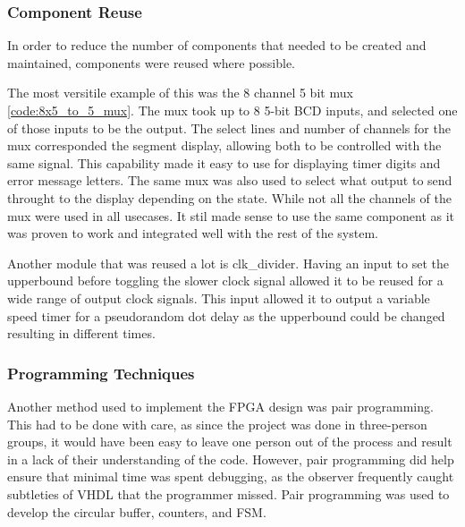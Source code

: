 \documentclass[11pt]{article}
\begin{document}


\subsubsection{Component Reuse}

In order to reduce the number of components that needed to be created and maintained, components were reused where possible. 

The most versitile example of this was the 8 channel 5 bit mux \ref{code:8x5_to_5_mux}. The mux took up to 8 5-bit BCD inputs, and selected one of those inputs to be the output. The select lines and number of channels for the mux corresponded the segment display, allowing both to be controlled with the same signal. This capability made it easy to use for displaying timer digits and error message letters. The same mux was also used to select what output to send throught to the display depending on the state. While not all the channels of the mux were used in all usecases. It stil made sense to use the same component as it was proven to work and integrated well with the rest of the system.

Another module that was reused a lot is clk_divider. Having an input to set the upperbound before toggling the slower clock signal allowed it to be reused for a wide range of output clock signals. This input allowed it to output a variable speed timer for a pseudorandom dot delay as the upperbound could be changed resulting in different times.

\subsubsection{Programming Techniques}

Another method used to implement the FPGA design was pair programming. This had to be done with care, as since the project was done in three-person groups, it would have been easy to leave one person out of the process and result in a lack of their understanding of the code. However, pair programming did help ensure that minimal time was spent debugging, as the observer frequently caught subtleties of VHDL that the programmer missed. Pair programming was used to develop the circular buffer, counters, and FSM.
\end{document}
